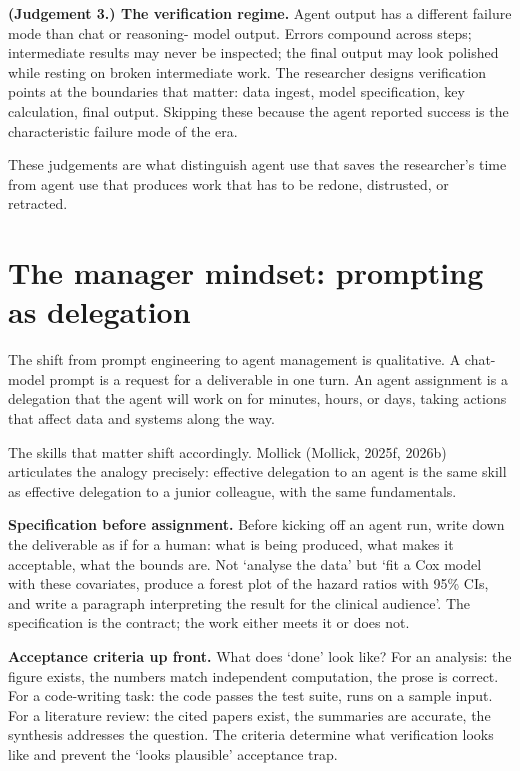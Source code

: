 \documentclass[
  letterpaper,
  11pt]{scrbook}
\begin{document}
\textbf{(Judgement 3.) The verification regime.} Agent output has a
different failure mode than chat or reasoning- model output. Errors
compound across steps; intermediate results may never be inspected; the
final output may look polished while resting on broken intermediate
work. The researcher designs verification points at the boundaries that
matter: data ingest, model specification, key calculation, final output.
Skipping these because the agent reported success is the characteristic
failure mode of the era.

These judgements are what distinguish agent use that saves the
researcher's time from agent use that produces work that has to be
redone, distrusted, or retracted.

\section{The manager mindset: prompting as
delegation}\label{the-manager-mindset-prompting-as-delegation}

The shift from prompt engineering to agent management is qualitative. A
chat-model prompt is a request for a deliverable in one turn. An agent
assignment is a delegation that the agent will work on for minutes,
hours, or days, taking actions that affect data and systems along the
way.

The skills that matter shift accordingly. Mollick (Mollick, 2025f,
2026b) articulates the analogy precisely: effective delegation to an
agent is the same skill as effective delegation to a junior colleague,
with the same fundamentals.

\textbf{Specification before assignment.} Before kicking off an agent
run, write down the deliverable as if for a human: what is being
produced, what makes it acceptable, what the bounds are. Not `analyse
the data' but `fit a Cox model with these covariates, produce a forest
plot of the hazard ratios with 95\% CIs, and write a paragraph
interpreting the result for the clinical audience'. The specification is
the contract; the work either meets it or does not.

\textbf{Acceptance criteria up front.} What does `done' look like? For
an analysis: the figure exists, the numbers match independent
computation, the prose is correct. For a code-writing task: the code
passes the test suite, runs on a sample input. For a literature review:
the cited papers exist, the summaries are accurate, the synthesis
addresses the question. The criteria determine what verification looks
like and prevent the `looks plausible' acceptance trap.
\end{document}
